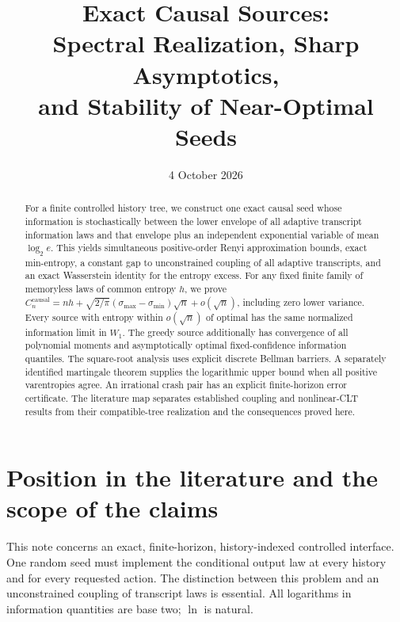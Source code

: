 \documentclass[11pt,a4paper]{article}
\title{Exact Causal Sources:\\Spectral Realization, Sharp Asymptotics,\\and Stability of Near-Optimal Seeds}
\author{}
\date{4 October 2026}
\newcommand{\causal}{\mathrm{causal}}
\begin{document}
\maketitle
\begin{abstract}
For a finite controlled history tree, we construct one exact causal seed
whose information is stochastically between the lower envelope of all
adaptive transcript information laws and that envelope plus an independent
exponential variable of mean $\log_2e$. This yields simultaneous
positive-order Renyi approximation bounds, exact min-entropy, a constant
gap to unconstrained coupling of all adaptive transcripts, and an exact
Wasserstein identity for the entropy excess. For any fixed finite family
of memoryless laws of common entropy $h$, we prove
$C_n^{\causal}=nh+\sqrt{2/\pi}(\sigma_{\max}-\sigma_{\min})\sqrt n+o(\sqrt n)$,
including zero lower variance. Every source with entropy within
$o(\sqrt n)$ of optimal has the same normalized information limit in
$W_1$. The greedy source additionally has convergence of all polynomial
moments and asymptotically optimal fixed-confidence information quantiles.
The square-root analysis uses explicit discrete Bellman barriers.
A separately identified martingale theorem supplies the logarithmic upper
bound when all positive varentropies agree. An irrational crash pair has
an explicit finite-horizon error certificate. The literature map separates
established coupling and nonlinear-CLT results from their compatible-tree
realization and the consequences proved here.
\end{abstract}
\tableofcontents
\newpage

\section{Position in the literature and the scope of the claims}\label{sec:literature}
This note concerns an exact, finite-horizon, history-indexed controlled
interface. One random seed must implement the conditional output law at
every history and for every requested action. The distinction between this
problem and an unconstrained coupling of transcript laws is essential.
All logarithms in information quantities are base two; $\ln$ is natural.
\end{document}
